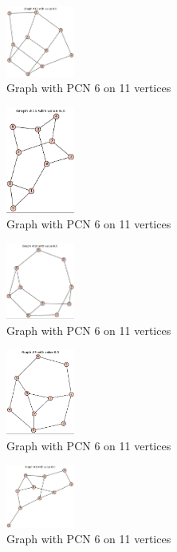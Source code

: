 \documentclass[12pt,a4paper]{amsart}
\theoremstyle{definition}
\theoremstyle{plain}
\begin{document}
\begin{figure}[h]
    \centering
    \includegraphics[width=0.2\textwidth]{Images/32}
    \caption{Graph with PCN 6 on 11 vertices}
\end{figure}
\begin{figure}[h]
    \centering
    \includegraphics[width=0.2\textwidth]{Images/33}
    \caption{Graph with PCN 6 on 11 vertices}
\end{figure}
\begin{figure}[h]
    \centering
    \includegraphics[width=0.2\textwidth]{Images/34}
    \caption{Graph with PCN 6 on 11 vertices}
\end{figure}
\begin{figure}[h]
    \centering
    \includegraphics[width=0.2\textwidth]{Images/35}
    \caption{Graph with PCN 6 on 11 vertices}
\end{figure}
\begin{figure}[h]
    \centering
    \includegraphics[width=0.2\textwidth]{Images/36}
    \caption{Graph with PCN 6 on 11 vertices}
\end{figure}
\end{document}
